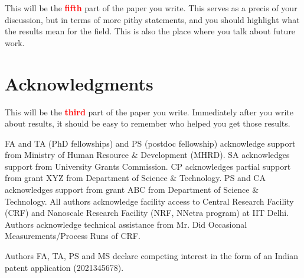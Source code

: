 \documentclass[12 pt]{article}
\begin{document}
This will be the \textbf{\Huge \textcolor{red}{fifth}} part of the paper you write. This serves as a precis of your discussion, but in terms of more pithy statements, and you should highlight what the results mean for the field. This is also the place where you talk about future work.

\section*{Acknowledgments}

This will be the \textbf{\Huge \textcolor{red}{third}} part of the paper you write. Immediately after you write about results, it should be easy to remember who helped you get those results.

FA and TA (PhD fellowships) and PS (postdoc fellowship) acknowledge support from Ministry of Human Resource \& Development (MHRD). SA acknowledges support from University Grants Commission. CP acknowledges partial support from grant XYZ from Department of Science \& Technology. PS and CA acknowledges support from grant ABC from Department of Science \& Technology. All authors acknowledge facility access to Central Research Facility (CRF) and Nanoscale Research Facility (NRF, NNetra program) at IIT Delhi. Authors acknowledge technical assistance from Mr. Did Occasional Measurements/Process Runs of CRF.

Authors FA, TA, PS and MS declare competing interest in the form of an Indian patent application (2021345678).

\printbibliography
\end{document}
